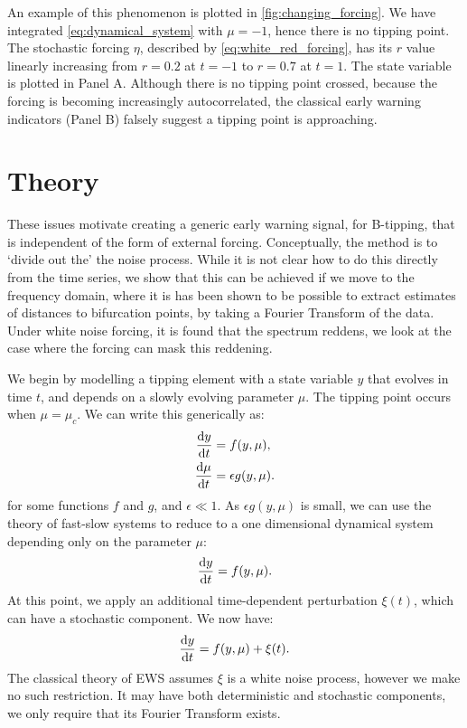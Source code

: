 An example of this phenomenon is plotted in
\cref{fig:changing_forcing}. We have integrated 
\cref{eq:dynamical_system} with $\mu = -1$, hence there is no 
tipping point. The stochastic forcing $\eta$, described by \cref{eq:white_red_forcing}, has its $r$ value
linearly increasing
from $r=0.2$ at $t=-1$ to $r=0.7$ at $t=1$. The state
variable is plotted in Panel A. Although there is no
tipping point crossed, because the forcing is becoming 
increasingly autocorrelated, the classical early warning indicators 
(Panel B) falsely suggest a tipping point is approaching.

\section{Theory}
\label{sec:theory}
These issues motivate creating a generic early warning signal, 
for B-tipping, that is 
independent of the form of external forcing. Conceptually,
the method is to `divide out the' the noise process.
While it is not clear
how to do this directly from the time series, we show that this can be achieved if we move
to the frequency domain, where it is has been shown to be possible
to extract estimates of distances to bifurcation 
points\cite{Kleinen2003}, by taking a Fourier Transform of the data. 
Under white noise forcing, it is found that the spectrum reddens\cite{Kefi2014,Dakos2012c}, we look at the case where the forcing 
can mask this reddening.

We begin by modelling a tipping element with a state variable $y$ that evolves in time $t$, and depends on a slowly evolving parameter $\mu$.  The tipping point occurs when $\mu=\mu_c$.
We can  write this generically as:
\begin{eqnarray}
\label{eq:full_syste}
    \dv{y}{t} &= f(y,\mu),\\
    \dv{\mu}{t} &= \epsilon g(y,\mu).
\end{eqnarray}
for some functions $f$ and $g$, and $\epsilon \ll 1$.
As $\epsilon g(y,\mu)$ is small, we can use the theory of fast-slow systems\cite{Kuehn2011} to reduce to a one
dimensional dynamical system depending only on the parameter $\mu$:
\begin{equation}
  \label{eq:1d_dynamical_sys}
  \dv{y}{t} = f(y,\mu).
\end{equation}
At this point, we apply an additional time-dependent perturbation $\xi(t)$, which can have a stochastic component. We now have:
\begin{equation}
  \label{eq:1d_dyn_sys_forced}
  \dv{y}{t} = f(y,\mu) + \xi(t).
\end{equation}
The classical theory of EWS assumes $\xi$ is a white noise process, however we make no such restriction. It may have both
deterministic and stochastic components, we only require that its 
Fourier Transform exists.


